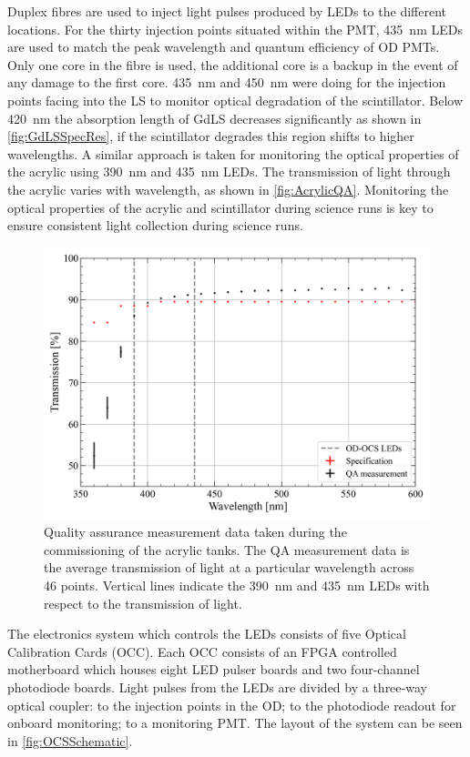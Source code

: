 Duplex fibres are used to inject light pulses produced by LEDs to the different locations. For the thirty injection points situated within the PMT, 435~nm LEDs are used to match the peak wavelength and quantum efficiency of OD PMTs. Only one core in the fibre is used, the additional core is a backup in the event of any damage to the first core. 435~nm and 450~nm were doing for the injection points facing into the LS to monitor optical degradation of the scintillator. Below 420~nm the absorption length of GdLS decreases significantly as shown in \autoref{fig:GdLSSpecRes}, if the scintillator degrades this region shifts to higher wavelengths. A similar approach is taken for monitoring the optical properties of the acrylic using 390~nm and 435~nm LEDs. The transmission of light through the acrylic varies with wavelength, as shown in \autoref{fig:AcrylicQA}. Monitoring the optical properties of the acrylic and scintillator during science runs is key to ensure consistent light collection during science runs.
\begin{figure}[h!]
    \centering
    \includegraphics[width=0.7\linewidth]{figures/LZ/T187-XDM-UVT_WAVELENGHT_08252017.png}
    \caption{Quality assurance measurement data taken during the commissioning of the acrylic tanks. The QA measurement data is the average transmission of light at a particular wavelength across 46 points. Vertical lines indicate the 390~nm and 435~nm LEDs with respect to the transmission of light.}
    \label{fig:AcrylicQA}
\end{figure}
The electronics system which controls the LEDs consists of five Optical Calibration Cards (OCC). Each OCC consists of an FPGA controlled motherboard which houses eight LED pulser boards and two four-channel photodiode boards. Light pulses from the LEDs are divided by a three-way optical coupler: to the injection points in the OD; to the photodiode readout for onboard monitoring; to a monitoring PMT. The layout of the system can be seen in \autoref{fig:OCSSchematic}.

